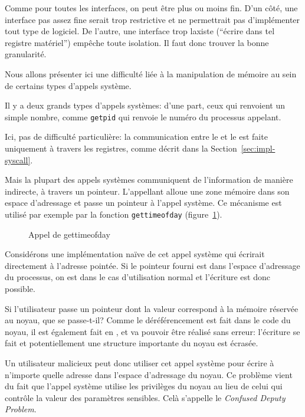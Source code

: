 Comme pour toutes les interfaces, on peut être plus ou moins fin. D'un
côté, une interface pas assez fine serait trop restrictive et ne permettrait pas
d'implémenter tout type de logiciel. De l'autre, une interface trop laxiste
(``écrire dans tel registre matériel'') empêche toute isolation. Il faut
donc trouver la bonne granularité.

Nous allons présenter ici une difficulté liée à la manipulation de mémoire au
sein de certains types d'appels système.

Il y a deux grands types d'appels systèmes: d'une part, ceux qui renvoient un
simple nombre, comme \texttt{getpid} qui renvoie le numéro du processus
appelant.


Ici, pas de difficulté particulière: la communication entre le  et le
 est faite uniquement à travers les registres, comme décrit dans la
Section~\ref{sec:impl-syscall}.

Mais la plupart des appels systèmes communiquent de l'information de manière
indirecte, à travers un pointeur. L'appellant alloue une zone mémoire dans son
espace d'adressage et passe un pointeur à l'appel système. Ce mécanisme est
utilisé par exemple par la fonction \texttt{gettimeofday}
(figure~\ref{fig:appel-gettimeofday}).

\begin{figure}[h]
\caption{Appel de gettimeofday}
\label{fig:appel-gettimeofday}
\end{figure}

Considérons une implémentation naïve de cet appel système qui écrirait
directement à l'adresse pointée. Si le pointeur fourni est dans l'espace
d'adressage du processus, on est dans le cas d'utilisation normal et l'écriture
est donc possible.

Si l'utilisateur passe un pointeur dont la valeur correspond à la mémoire
réservée au noyau, que se passe-t-il? Comme le déréférencement est fait dans le
code du noyau, il est également fait en , et va pouvoir être réalisé
sans erreur: l'écriture se fait et potentiellement une structure importante du
noyau est écrasée.

Un utilisateur malicieux peut donc utiliser cet appel système pour écrire à
n'importe quelle adresse dans l'espace d'adressage du noyau. Ce problème vient
du fait que l'appel système utilise les privilèges du noyau au lieu de celui qui
contrôle la valeur des paramètres sensibles. Celà s'appelle le \emph{Confused
Deputy Problem}\cite{hardy88confused}.

